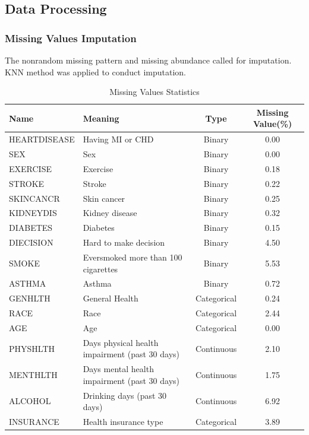 \documentclass[11pt]{article}
\begin{document}
\vspace{-0.2cm}
\subsection{Data Processing}

\subsubsection{Missing Values Imputation}
The nonrandom missing pattern and missing abundance called for imputation. KNN method was applied to conduct imputation.

\begin{table}[hbt]
    \centering
    \caption{Missing Values Statistics}
    \label{missstat}
    \begin{tabular}{llcc}
        \hline
        Name & Meaning & Type & Missing Value(\%)  \\ 
        \hline
        HEARTDISEASE & Having MI or CHD & Binary & 0.00  \\ 
        SEX & Sex & Binary & 0.00  \\ 
        EXERCISE & Exercise & Binary & 0.18  \\ 
        STROKE & Stroke & Binary & 0.22  \\ 
        SKINCANCR & Skin cancer & Binary & 0.25  \\ 
        KIDNEYDIS & Kidney disease & Binary & 0.32  \\ 
        DIABETES & Diabetes & Binary & 0.15  \\ 
        DIECISION & Hard to make decision & Binary & 4.50  \\ 
        SMOKE & Eversmoked more than 100 cigarettes & Binary & 5.53  \\ 
        ASTHMA & Asthma & Binary & 0.72  \\ 
        GENHLTH & General Health & Categorical & 0.24  \\ 
        RACE & Race & Categorical & 2.44  \\ 
        AGE & Age & Categorical & 0.00  \\ 
        PHYSHLTH & Days physical health impairment (past 30 days) & Continuous & 2.10  \\ 
        MENTHLTH & Days mental health impairment (past 30 days) & Continuous & 1.75  \\ 
        ALCOHOL & Drinking days (past 30 days) & Continuous & 6.92  \\ 
        INSURANCE & Health insurance type & Categorical & 3.89  \\ 

\end{tabular}
\end{table}
\end{document}
